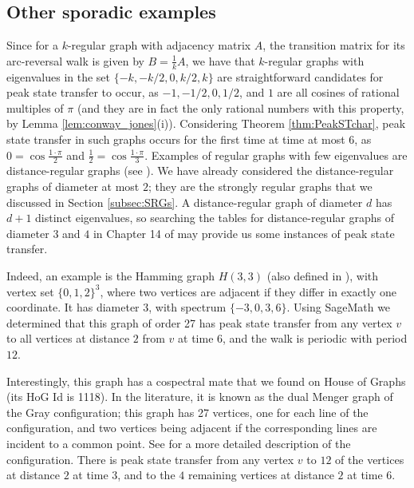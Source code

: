 \documentclass{article}
\numberwithin{equation}{section}
\begin{document}
\subsection{Other sporadic examples}
\label{subsec:other_examples}

Since for a $k$-regular graph with adjacency matrix $A$, the transition matrix for its arc-reversal walk is given by $B = \frac{1}{k}A$, we have that $k$-regular graphs with eigenvalues in the set $\{-k,-k/2,0,k/2,k\}$ are straightforward candidates for peak state transfer to occur, as $-1,-1/2,0,1/2$, and $1$ are all cosines of rational multiples of $\pi$ (and they are in fact the only rational numbers with this property, by Lemma \ref{lem:conway_jones}(i)). Considering Theorem \ref{thm:PeakSTchar}, peak state transfer in such graphs occurs for the first time at time at most $6$, as $0 = \cos\frac{1 \cdot \pi}{2}$ and $\frac{1}{2} = \cos\frac{1 \cdot \pi}{3}$. Examples of regular graphs with few eigenvalues are distance-regular graphs (see \cite{BroCohNeu1989}). We have already considered the distance-regular graphs of diameter at most $2$; they are the strongly regular graphs that we discussed in Section \ref{subsec:SRGs}. A distance-regular graph of diameter $d$ has $d+1$ distinct eigenvalues, so searching the tables for distance-regular graphs of diameter $3$ and $4$ in Chapter 14 of \cite{BroCohNeu1989} may provide us some instances of peak state transfer.

Indeed, an example is the Hamming graph $H(3,3)$ (also defined in \cite{BroCohNeu1989}), with vertex set $\{0,1,2\}^3$, where two vertices are adjacent if they differ in exactly one coordinate. It has diameter $3$, with spectrum $\{-3,0,3,6\}$. Using SageMath \cite{sagemath} we determined that this graph of order 27 has peak state transfer from any vertex $v$ to all vertices at distance $2$ from $v$ at time $6$, and the walk is periodic with period $12$.


Interestingly, this graph has a cospectral mate that we found on House of Graphs \cite{CooDhoGoe2023} (its HoG Id is 1118). In the literature, it  is known as the dual Menger graph of the Gray configuration; this graph has 27 vertices, one for each  line of the configuration, and  two vertices being adjacent if the corresponding lines are incident to a common point. See \cite{MarPisTom2005} for a more detailed description of the configuration. There is peak state transfer from any vertex $v$ to $12$ of the vertices at distance $2$ at time $3$, and to the $4$ remaining vertices at distance $2$ at time $6$.
\end{document}
